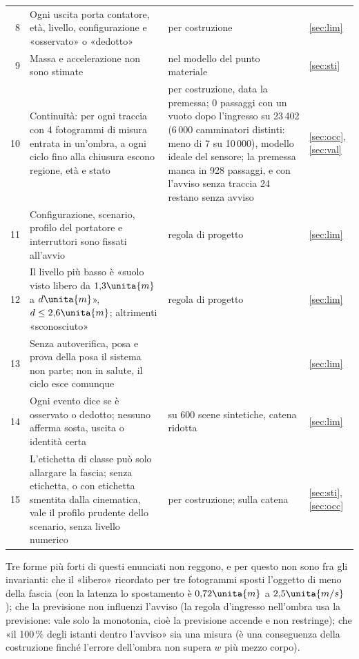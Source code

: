 \begin{table}[H]
\begin{tabularx}{\linewidth}{@{}rLLp{1.1cm}@{}}
8 & Ogni uscita porta contatore, età, livello, configurazione e «osservato» o «dedotto» & per costruzione & \ref{sec:lim}\\
9 & Massa e accelerazione non sono stimate &  nel modello del punto materiale & \ref{sec:sti}\\
10 & Continuità: per ogni traccia con 4 fotogrammi di misura entrata in un'ombra, a ogni ciclo fino alla chiusura escono regione, età e stato & per costruzione, data la premessa;  0 passaggi con un vuoto dopo l'ingresso su 23\,402 (6\,000 camminatori distinti: meno di 7 su 10\,000), modello ideale del sensore; la premessa manca in 928 passaggi, e con l'avviso senza traccia 24 restano senza avviso & \ref{sec:occ}, \ref{sec:val}\\
11 & Configurazione, scenario, profilo del portatore e interruttori sono fissati all'avvio & regola di progetto & \ref{sec:lim}\\
12 & Il livello più basso è «suolo visto libero da $1{,}3\unita{m}$ a $d\unita{m}$», $d\le2{,}6\unita{m}$; altrimenti «sconosciuto» & regola di progetto & \ref{sec:lim}\\
13 & Senza autoverifica, posa e prova della posa il sistema non parte; non in salute, il ciclo esce comunque &  & \ref{sec:lim}\\
14 & Ogni evento dice se è osservato o dedotto; nessuno afferma sosta, uscita o identità certa &  su 600 scene sintetiche, catena ridotta & \ref{sec:lim}\\
15 & L'etichetta di classe può solo allargare la fascia; senza etichetta, o con etichetta smentita dalla cinematica, vale il profilo prudente dello scenario, senza livello numerico & per costruzione;  sulla catena & \ref{sec:sti}, \ref{sec:occ}\\
\bottomrule
\end{tabularx}
\end{table}

Tre forme più forti di questi enunciati non reggono, e per questo non sono fra gli invarianti: che il «libero» ricordato per tre fotogrammi sposti l'oggetto di meno della fascia (con la latenza lo spostamento è $0{,}72\unita{m}$ a $2{,}5\unita{m/s}$ ); che la previsione non influenzi l'avviso (la regola d'ingresso nell'ombra usa la previsione: vale solo la monotonia, cioè la previsione accende e non restringe); che «il 100\,\% degli istanti dentro l'avviso» sia una misura (è una conseguenza della costruzione finché l'errore dell'ombra non supera $w$ più mezzo corpo).

